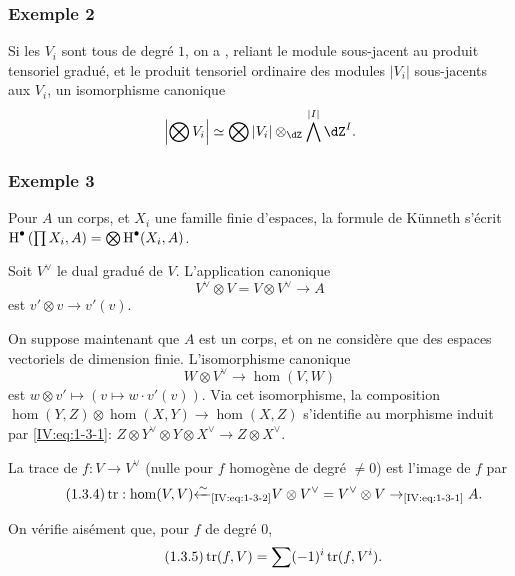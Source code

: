 \subsubsection*{Exemple 2}

Si les $V_i$ sont tous de degré $1$, on a , reliant le module sous-jacent au 
produit tensoriel gradué, et le produit tensoriel ordinaire des modules 
$|V_i|$ sous-jacents aux $V_i$, un isomorphisme canonique 
\[
  \left|\bigotimes V_i\right| \simeq \bigotimes |V_i|\otimes_{\dZ}\bigwedge^{|I|}\dZ^I \text{.}
\]





\subsubsection*{Exemple 3}

Pour $A$ un corps, et $X_i$ une famille finie d'espaces, la formule de 
K\"unneth s'écrit 
$\operatorname{H}^\bullet\left(\prod X_i,A\right) = \bigotimes \operatorname{H}^\bullet(X_i,A)$. 

Soit $V^\vee$ le dual gradué de $V$. L'application canonique 
\begin{equation*}\tag{1.3.1}\label{IV:eq:1-3-1}
  V^\vee\otimes V = V\otimes V^\vee \to A
\end{equation*}
est $v'\otimes v\to v'(v)$. 

On suppose maintenant que $A$ est un corps, et on ne considère que des 
espaces vectoriels de dimension finie. L'isomorphisme canonique 
\begin{equation*}\tag{1.3.2}\label{IV:eq:1-3-2}
  W\otimes V^\vee \to \hom(V,W) 
\end{equation*}
est $w\otimes v'\mapsto \left(v\mapsto w\cdot v'(v)\right)$. Via cet 
isomorphisme, la composition $\hom(Y,Z)\otimes \hom(X,Y)\to \hom(X,Z)$ 
s'identifie au morphisme induit par \eqref{IV:eq:1-3-1}: 
$Z\otimes Y^\vee\otimes Y\otimes X^\vee \to Z\otimes X^\vee$. 

La trace de $f:V\to V^\vee$ (nulle pour $f$ homogène de degré $\ne 0$) est 
l'image de $f$ par 
\begin{equation*}\tag{1.3.4}\label{IV:eq:1-3-4}
  \operatorname{tr}:\hom(V,V) {\xleftarrow\sim}_\text{\eqref{IV:eq:1-3-2}} V\otimes V^\vee = V^\vee \otimes V \to_\text{\eqref{IV:eq:1-3-1}} A .
\end{equation*}

On vérifie aisément que, pour $f$ de degré $0$, 
\begin{equation*}\tag{1.3.5}\label{IV:eq:1-3-5}
  \operatorname{tr}(f,V) = \sum (-1)^i \operatorname{tr}(f,V^i) \text{.}
\end{equation*}

